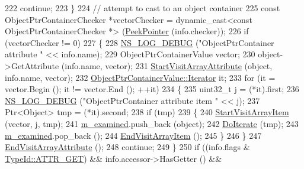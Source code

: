 \begin{DoxyCode}
222               \textcolor{keywordflow}{continue};
223             \}
224           \textcolor{comment}{// attempt to cast to an object container}
225           \textcolor{keyword}{const} ObjectPtrContainerChecker *vectorChecker = \textcolor{keyword}{dynamic\_cast<}\textcolor{keyword}{const }ObjectPtrContainerChecker *\textcolor{keyword}{>} 
      (\hyperlink{namespacens3_af2a7557fe9afdd98d8f6f8f6e412cf5a}{PeekPointer} (info.checker));
226           \textcolor{keywordflow}{if} (vectorChecker != 0)
227             \{
228               \hyperlink{group__logging_ga413f1886406d49f59a6a0a89b77b4d0a}{NS\_LOG\_DEBUG} (\textcolor{stringliteral}{"ObjectPtrContainer attribute "} << info.name);
229               ObjectPtrContainerValue vector;
230               \textcolor{keywordtype}{object}->GetAttribute (info.name, vector);
231               \hyperlink{classns3_1_1AttributeIterator_a5b850640b21a8ced46c4109be804a84a}{StartVisitArrayAttribute} (\textcolor{keywordtype}{object}, info.name, vector);
232               \hyperlink{classns3_1_1ObjectPtrContainerValue_a1f0661f9cf3626d62a4623f36b672876}{ObjectPtrContainerValue::Iterator} it;
233               \textcolor{keywordflow}{for} (it = vector.Begin (); it != vector.End (); ++it)
234                 \{
235                   uint32\_t j = (*it).first;
236                   \hyperlink{group__logging_ga413f1886406d49f59a6a0a89b77b4d0a}{NS\_LOG\_DEBUG} (\textcolor{stringliteral}{"ObjectPtrContainer attribute item "} << j);
237                   Ptr<Object> tmp = (*it).second;
238                   \textcolor{keywordflow}{if} (tmp)
239                     \{
240                       \hyperlink{classns3_1_1AttributeIterator_aa437c2c642c6541b01cf7abcfe92dcaf}{StartVisitArrayItem} (vector, j, tmp);
241                       \hyperlink{classns3_1_1AttributeIterator_ab43bac2d9c3ddcc7aa92ab5b727741dc}{m\_examined}.push\_back (\textcolor{keywordtype}{object});
242                       \hyperlink{classns3_1_1AttributeIterator_a01259d50f232e21c9c605547e26b34bb}{DoIterate} (tmp);
243                       \hyperlink{classns3_1_1AttributeIterator_ab43bac2d9c3ddcc7aa92ab5b727741dc}{m\_examined}.pop\_back ();
244                       \hyperlink{classns3_1_1AttributeIterator_a9fe5a4891c256c2e934e0eadf0e4557a}{EndVisitArrayItem} ();
245                     \}
246                 \}
247               \hyperlink{classns3_1_1AttributeIterator_a7fa62d06b3f83411f250091217f253de}{EndVisitArrayAttribute} ();
248               \textcolor{keywordflow}{continue};
249             \}
250           \textcolor{keywordflow}{if} ((info.flags & \hyperlink{classns3_1_1TypeId_a3ab7b43b95f96391c514d609ca60e542a3dd4b476c9b257285c177d6c414b5fd0}{TypeId::ATTR\_GET}) && info.accessor->HasGetter () && 

\end{DoxyCode}
